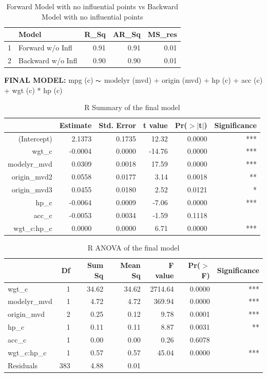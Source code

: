 \documentclass{article}
\newcommand{\mt}[1]{\ensuremath{#1}}
\newcommand{\tl}{\mt{\thicksim} }
\begin{document}
\begin{table}[ht]
\centering
\begin{tabular}{rlrrr}
  \hline
 & Model & R\_Sq & AR\_Sq & MS\_res \\ 
  \hline
1 & Forward w/o Infl & 0.91 & 0.91 & 0.01 \\ 
  2 & Backward w/o Infl & 0.90 & 0.90 & 0.01 \\ 
   \hline
\end{tabular}
\caption{Forward Model with no influential points vs Backward Model with no influential points}
\label{tab:forwardvsbackwardnoinfluential}
\end{table}

\clearpage
\newpage 

\textbf{FINAL MODEL:}
mpg (c) \tl modelyr (mvd) + origin (mvd) + hp (c) + acc (c) + wgt (c) * hp (c)

\begin{table}[ht]
\centering
\begin{tabular}{rrrrrr}
  \hline
 & Estimate & Std. Error & t value & Pr($>$$|$t$|$) & Significance\\ 
  \hline
(Intercept) & 2.1373 & 0.1735 & 12.32 & 0.0000 & *** \\ 
  wgt\_c & -0.0004 & 0.0000 & -14.76 & 0.0000 & *** \\ 
  modelyr\_mvd & 0.0309 & 0.0018 & 17.59 & 0.0000 & *** \\ 
  origin\_mvd2 & 0.0558 & 0.0177 & 3.14 & 0.0018 & ** \\ 
  origin\_mvd3 & 0.0455 & 0.0180 & 2.52 & 0.0121 & * \\ 
  hp\_c & -0.0064 & 0.0009 & -7.06 & 0.0000 & *** \\ 
  acc\_c & -0.0053 & 0.0034 & -1.59 & 0.1118 & \\ 
  wgt\_c:hp\_c & 0.0000 & 0.0000 & 6.71 & 0.0000 & *** \\ 
   \hline
\end{tabular}
\caption{R Summary of the final model}
\label{tab:summaryfinalmodel}
\end{table}

\begin{table}[ht]
\centering
\begin{tabular}{lrrrrrr}
  \hline
 & Df & Sum Sq & Mean Sq & F value & Pr($>$F) & Significance \\ 
  \hline
wgt\_c & 1 & 34.62 & 34.62 & 2714.64 & 0.0000 & *** \\ 
  modelyr\_mvd & 1 & 4.72 & 4.72 & 369.94 & 0.0000 & *** \\ 
  origin\_mvd & 2 & 0.25 & 0.12 & 9.78 & 0.0001 & *** \\ 
  hp\_c & 1 & 0.11 & 0.11 & 8.87 & 0.0031 & ** \\ 
  acc\_c & 1 & 0.00 & 0.00 & 0.26 & 0.6078 & \\ 
  wgt\_c:hp\_c & 1 & 0.57 & 0.57 & 45.04 & 0.0000 & *** \\ 
  Residuals & 383 & 4.88 & 0.01 &  &  & \\ 
   \hline
\end{tabular}
\caption{R ANOVA of the final model}
\label{tab:anovafinalmodel}
\end{table}
\end{document}

